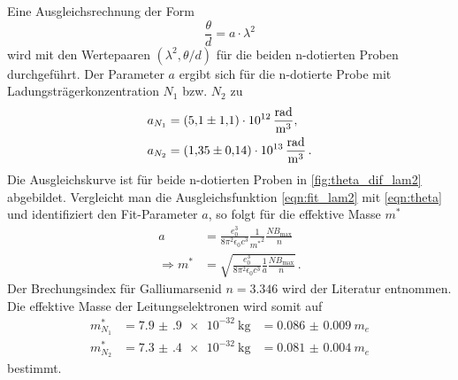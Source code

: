 Eine Ausgleichsrechnung der Form
\begin{equation}
    \frac{\theta}{d} = a \cdot \lambda^2
    \label{eqn:fit_lam2}
\end{equation}
wird mit den Wertepaaren $(\lambda^2, \theta / d)$ für die beiden n-dotierten Proben durchgeführt.
Der Parameter $a$ ergibt sich für die n-dotierte Probe mit Ladungsträgerkonzentration $N_1$ bzw. $N_2$ zu
\begin{align*}
    a_{N_1} &= \qty{5.1(11)e+12}{\frac{rad}{\metre^3}}, \\
    a_{N_2} &= \qty{1.35(14)e+13}{\frac{rad}{\metre^3}} \, . \\
\end{align*}
Die Ausgleichskurve ist für beide n-dotierten Proben in \autoref{fig:theta_dif_lam2} abgebildet.
Vergleicht man die Ausgleichsfunktion \autoref{eqn:fit_lam2} mit \autoref{eqn:theta} und identifiziert den Fit-Parameter $a$, so folgt für die effektive Masse $m^*$%
\begin{align}
    a &= \frac{e_0^3}{8 \pi^2 \epsilon_0 c^3} \frac{1}{{m^*}^2} \frac{N B_\text{max}}{n} \\
    \Rightarrow m^* &= \sqrt{\frac{e_0^3}{8 \pi^2 \epsilon_0 c^3} \frac{1}{a} \frac{N B_\text{max}}{n}} \, .
\end{align}
Der Brechungsindex für Galliumarsenid $n = 3.346$ wird der Literatur \cite{GaAs_n} entnommen.
Die effektive Masse der Leitungselektronen wird somit auf
\begin{align*}
    m^*_{N_1} &= \qty{7.9(9)e-32}{\kilo\gram} &= \qty{0.086(9)}{m_e} \\
    m^*_{N_2} &= \qty{7.3(4)e-32}{\kilo\gram} &= \qty{0.081(4)}{m_e}
\end{align*}
bestimmt.
\FloatBarrier